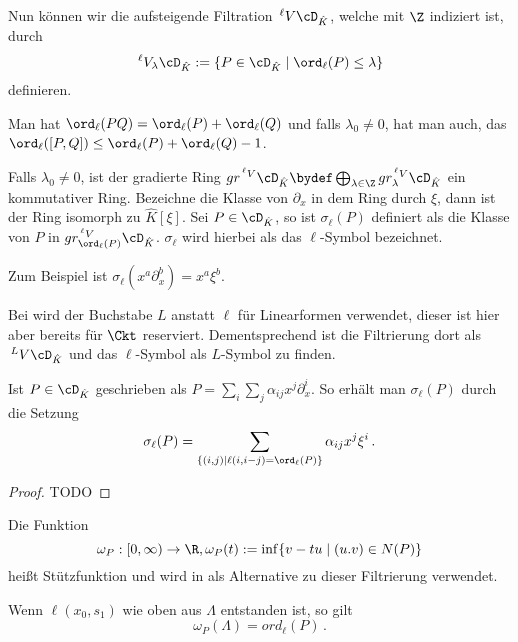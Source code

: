 \begin{defn}
Nun können wir die aufsteigende Filtration $\,^\ell V\cD_{\hat K}$, welche mit
$\Z$ indiziert ist, durch
\[
\,^\ell V_\lambda\cD_{\hat K}:=\{P\in\cD_{\hat K}\mid \ord_\ell(P)\leq \lambda\}
\]
definieren.
\end{defn}
\begin{bem}
Man hat $\ord_\ell(PQ)=\ord_\ell(P)+\ord_\ell(Q)$ und falls $\lambda_0\neq 0$,
hat man auch, das $\ord_\ell([P,Q])\leq \ord_\ell(P)+\ord_\ell(Q)-1$.
\end{bem}
\begin{defn}
Falls $\lambda_0\neq 0$, ist der gradierte Ring $gr^{\,^\ell V}\cD_{\hat
K}\bydef \bigoplus_{\lambda \in \Z}gr_\lambda^{\,^\ell V}\cD_{\hat K}$ ein
kommutativer Ring. Bezeichne die Klasse von $\partial_x$ in dem Ring durch
$\xi$, dann ist der Ring isomorph zu $\hat K[\xi]$.
%
Sei $P\in \cD_{\hat K}$, so ist $\sigma_\ell(P)$ definiert als die Klasse von
$P$ in $gr_{\ord_\ell(P)}^{\,^\ell V}\cD_{\hat K}$. $\sigma_\ell$ wird hierbei
als das $\ell$-Symbol bezeichnet.
\end{defn}
Zum Beispiel ist $\sigma_\ell(x^a\partial_x^b)=x^a\xi^b$.
\begin{bem}
Bei \cite{sabbah_cimpa90} wird der Buchstabe $L$ anstatt $\ell$ für
Linearformen verwendet, dieser ist hier aber bereits für $\Ckt$ reserviert.
Dementsprechend ist die Filtrierung dort als $\,^L V\cD_{\hat K}$ und das
$\ell$-Symbol als $L$-Symbol zu finden.
\end{bem}
\begin{bem}
Ist $P\in \cD_{\hat K}$ geschrieben als
$P=\sum_i\sum_j\alpha_{ij}x^j\partial_x^i$.
So erhält man $\sigma_\ell(P)$ durch die Setzung
\[
\sigma_\ell(P)=\sum_{\{(i,j)\mid\ell(i,i-j)=\ord_\ell(P)\}}\alpha_{ij}x^j\xi^i \,.
\]
\end{bem}
\begin{proof}
TODO
\end{proof}
\begin{comment}
Ich will die Linearform vermeiden und direkt die skalare Steigung verwenden
\end{comment}
\begin{defn}[Stützfunktion]
Die Funktion
\[
\omega_P:[0,\infty)\rightarrow\R, \omega_P(t):=\inf\{v-tu \mid (u.v) \in N(P)\}
\]
heißt Stützfunktion und wird in \cite{ZulaBarbara} als Alternative zu dieser
Filtrierung verwendet.
\end{defn}
\begin{bem}
Wenn $\ell(x_0,s_1)$ wie oben aus $\Lambda$ entstanden ist, so gilt
\[
\omega_P(\Lambda)=ord_\ell(P) \,.
\]
\end{bem}
\begin{comment}
TODO: ist $\ell$ Slope (gehört zu Slope) dann hat $\sigma_\ell(P)$ zumindest 2
Monome
\end{comment}

